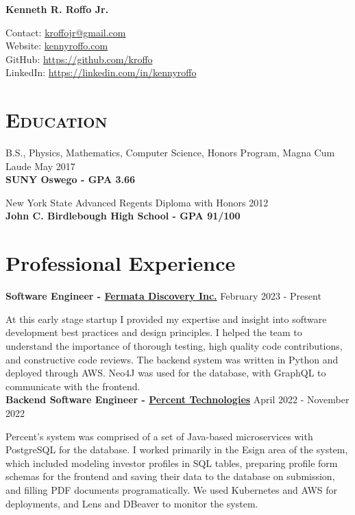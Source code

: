 \documentclass[8pt]{article}
\def\name{Kenneth R. Roffo Jr.}
\renewenvironment{itemize}{
  \begin{list}{}{
    \setlength{\leftmargin}{1.5em}
  }
}{
  \end{list}
}
\begin{document}
{\huge \bf \name}


Contact: \href{mailto:kroffojr@gmail.com}{kroffojr@gmail.com}\\
Website: \href{http://kennyroffo.com}{kennyroffo.com}\\
GitHub: \href{https://github.com/kroffo}{https://github.com/kroffo}\\
LinkedIn: \href{https://www.linkedin.com/in/kennyroffo}{https://linkedin.com/in/kennyroffo}

\section*{\textsc{Education}}

\begin{itemize}
  \item B.S., Physics, Mathematics, Computer Science, Honors Program, Magna Cum Laude \hfill May 2017\\
  \textbf{SUNY Oswego - GPA 3.66}
  \item New York State Advanced Regents Diploma with Honors \hfill 2012\\
  \textbf{John C. Birdlebough High School - GPA 91/100}
  \end{itemize}


\section*{Professional Experience}
\textbf{Software Engineer - \href{https://www.fermatadiscovery.com/}{Fermata Discovery Inc.}} \hfill February 2023 - Present

At this early stage startup I provided my expertise and insight into software development best practices and design principles. I helped the team to understand the importance of thorough testing, high quality code contributions, and constructive code reviews. The backend system was written in Python and deployed through AWS. Neo4J was used for the database, with GraphQL to communicate with the frontend.\\

\textbf{Backend Software Engineer - \href{https://percent.com/}{Percent Technologies}} \hfill April 2022 - November 2022

Percent's system was comprised of a set of Java-based microservices with PostgreSQL for the database. I worked primarily in the Esign area of the system, which included modeling investor profiles in SQL tables,  preparing profile form schemas for the frontend and saving their data to the database on submission, and filling PDF documents programatically. We used Kubernetes and AWS for deployments, and Lens and DBeaver to monitor the system.\\
\end{document}
